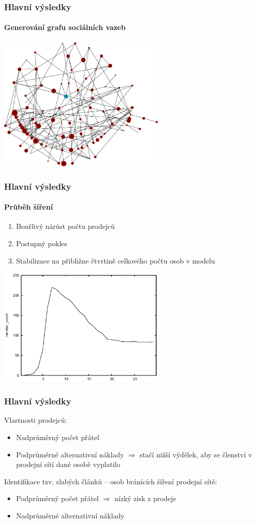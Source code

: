 \documentclass[xcolor=dvipsnames]{beamer}
\begin{document}
  \begin{frame}
    \frametitle{Hlavní výsledky}
    \framesubtitle{Generování grafu sociálních vazeb}
    \begin{center}\includegraphics[width=0.6\textwidth]{oriflame7_view1.png}\end{center}
  \end{frame}
  \begin{frame}
    \frametitle{Hlavní výsledky}
    \framesubtitle{Průběh šíření}
    \begin{enumerate}
      \item Bouřlivý nárůst počtu prodejců
      \item Postupný pokles
      \item Stabilizace na přibližne čtvrtině celkového počtu osob v modelu
    \end{enumerate}
    \begin{center}\includegraphics[width=0.6\textwidth]{member_count.eps}\end{center}
  \end{frame}
  \begin{frame}
    \frametitle{Hlavní výsledky}
    Vlastnosti prodejců:
    \begin{itemize}
      \item Nadprůměrný počet přátel
      \item Podprůměrné alternativní náklady $\Rightarrow$ stačí nižší výdělek, aby se členství v prodejní sítí dané osobě vyplatilo
    \end{itemize}
    Identifikace tzv. slabých článků -- osob bránících šíření prodejní sítě:
    \begin{itemize}
      \item Podprůměrný počet přátel $\Rightarrow$ nízký zisk z prodeje 
      \item Nadprůměrné alternativní náklady
    \end{itemize}
  \end{frame}
\end{document}
